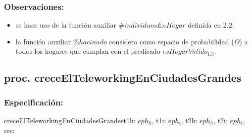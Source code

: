 \documentclass[a4paper]{article}
\begin{document}
    \subsubsection{Observaciones:}
        \begin{itemize}
            \item se hace uso de la funci\'on auxiliar ${\#}individuosEnHogar$ definida en 2.2.
            \item la funci\'on auxiliar ${\%}hacinado$ considera como espacio de probabilidad ($\Omega$) a todos los hogares que cumplan 
            con el predicado $esHogarValido_{1{.}3}$.
        \end{itemize}


\pagebreak
\subsection{proc. creceElTeleworkingEnCiudadesGrandes}

    \subsubsection{Especificaci\'on:}
        \begin{proc}{creceElTeleworkingEnCiudadesGrandes}{\In t1h: $eph_{h}$, \In t1i: $eph_{i}$, \In t2h: $eph_{h}$, \In t2i: $eph_{i}$, \Out res: \bool}{}
        \end{proc}
\end{document}
